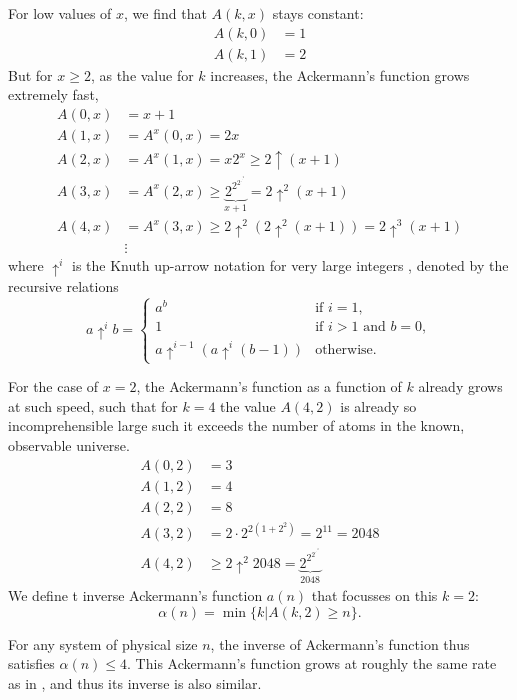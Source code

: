 For low values of $x$, we find that $A(k,x)$ stays constant:
\begin{align*}
    A(k,0) &= 1 \\
    A(k,1) &= 2
\end{align*}
But for $x\geq 2$, as the value for $k$ increases, the Ackermann's function grows extremely fast,
\begin{align*}
    A(0,x) &= x+1 \\
    A(1,x) &= A^x(0,x) = 2x  \\
    A(2,x) &= A^x(1,x) = x2^x \geq 2 \uparrow (x+1)\\
    A(3,x) &= A^x(2,x) \geq  \underbrace{2^{2^{2^{.^{.^2}}}}}_{x+1} = 2\uparrow ^2 (x+1) \\
    A(4,x) &= A^x(3,x) \geq 2\uparrow^2(2\uparrow^2(x+1)) = 2\uparrow ^3 (x+1)\\
    &\vdots
\end{align*}
where $\uparrow^i$ is the Knuth up-arrow notation for very large integers \cite{knuth1976mathematics}, denoted by the recursive relations
\begin{equation}
    a\uparrow^i b = \begin{cases}
        a^b &\text{if }i=1,\\
        1   &\text{if }i>1 \text{ and } b=0,\\
        a\uparrow^{i-1}(a \uparrow^i(b-1)) &\text{otherwise.}
    \end{cases}
\end{equation}

For the case of $x=2$, the Ackermann's function as a function of $k$ already grows at such speed, such that for $k=4$ the value $A(4,2)$ is already so incomprehensible large such it exceeds the number of atoms in  the known, observable universe. 
\begin{align*}
    A(0,2) &= 3 \\
    A(1,2) &= 4  \\
    A(2,2) &= 8\\
    A(3,2) &= 2\cdot 2^{2(1+2^2)} = 2^11 = 2048\\
    A(4,2) &\geq 2\uparrow^2 2048 = \underbrace{2^{2^{2^{.^{.^2}}}}}_{2048}
\end{align*}
We define t inverse Ackermann's function $a(n)$ that focusses on this $k=2$:
\begin{equation}
    \alpha(n) = \min\{k | A(k,2) \geq n \}.
\end{equation}

For any system of physical size $n$, the inverse of Ackermann's function thus satisfies $\alpha(n) \leq 4$. This Ackermann's function grows at roughly the same rate as in \cite{tarjan1975efficiency}, and thus its inverse is also similar.
